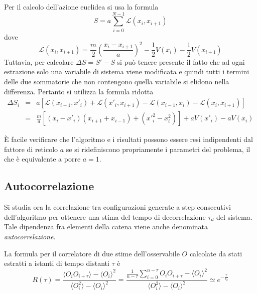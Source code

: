 Per il calcolo dell'azione euclidea si usa la formula
$$S = a\displaystyle\sum\limits_{i=0}^{N-1} \mathcal{L}(x_{i},x_{i+1})$$
dove
$$\mathcal{L}(x_{i},x_{i+1}) = \frac{m}{2}\left(\frac{x_{i}-x_{i+1}}{a}\right)^{2}-\frac{1}{2}V(x_{i})-\frac{1}{2}V(x_{i+1})$$
Tuttavia, per calcolare $\Delta S = S'-S$ si può tenere presente il fatto che ad ogni estrazione solo una variabile di sistema viene modificata e quindi tutti i termini delle due sommatorie che non contengono quella variabile si elidono nella differenza. Pertanto si utilizza la formula ridotta
\begin{eqnarray*}
 \Delta S_i &=& a[\mathcal{L}(x_{i-1},x'_{i})+\mathcal{L}(x'_{i},x_{i+1})-\mathcal{L}(x_{i-1},x_{i})-\mathcal{L}(x_{i},x_{i+1})]\\
   &=& \tfrac{m}{a}[(x_{i}-x'_{i})(x_{i+1}+x_{i-1})+(x'^2_i-x^2_i)]+aV(x'_i)-aV(x_i)
\end{eqnarray*}

È facile verificare che l'algoritmo e i risultati possono essere resi indipendenti dal fattore di reticolo $a$ se si ridefiniscono propriamente i parametri del problema, il che è equivalente a porre $a=1$.

\subsection{Autocorrelazione}

Si studia ora la correlazione tra configurazioni generate a step consecutivi dell'algoritmo per ottenere una stima del tempo di decorrelazione $\tau_d$ del sistema. Tale dipendenza fra elementi della catena viene anche denominata \textit{autocorrelazione}.

La formula per il correlatore di due stime dell'osservabile $O$ calcolate da stati estratti a istanti di tempo distanti $\tau$ è
$$R(\tau)=\frac{\langle O_iO_{i+\tau}\rangle-\langle O_i\rangle^2}{\langle O_i^2\rangle-\langle O_i\rangle^2}=\frac{\frac{1}{n-\tau}\sum\limits_{i=0}^{n-\tau}O_iO_{i+\tau}-\langle O_i\rangle^2}{\langle O_i^2\rangle-\langle O_i\rangle^2}\simeq e^{-\tfrac{\tau}{\tau_d}}$$

